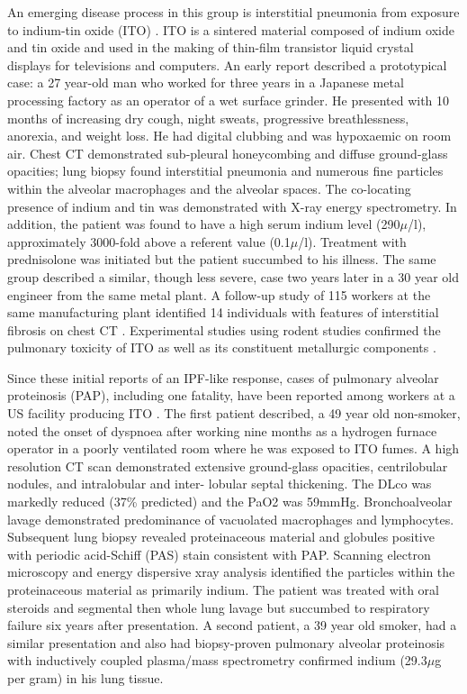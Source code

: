 \documentclass[a4
er,12pt]{article}
\begin{document}
An emerging disease process in this group is interstitial pneumonia from exposure to indium-tin oxide (ITO) \cite{Cummings2010,Cummings2012,Cummings2013,Homma2003,Homma2005, Lison2010,Lison2009,Omae2011,Tanaka2010,Xiao2010}. ITO is a sintered material composed of indium oxide and tin oxide and used in the making of thin-film transistor liquid crystal displays for televisions and computers. An early report \cite{Homma2003} described a prototypical case: a 27 year-old man who worked for three years in a Japanese metal processing factory as an operator of a wet surface grinder. He presented with 10 months of increasing dry cough, night sweats, progressive breathlessness, anorexia, and weight loss. He had digital clubbing and was hypoxaemic on room air. Chest CT demonstrated sub-pleural honeycombing and diffuse ground-glass opacities; lung biopsy found interstitial pneumonia and numerous fine particles within the alveolar macrophages and the alveolar spaces. The co-locating presence of indium and tin was demonstrated with X-ray energy spectrometry. In addition, the patient was found to have a high serum indium level (290\ensuremath{\mu}/l), approximately 3000-fold above a referent value (0.1\ensuremath{\mu}/l). Treatment with prednisolone was initiated but the patient succumbed to his illness. The same group described a similar, though less severe, case two years later \cite{Homma2005} in a 30 year old engineer from the same metal plant. A follow-up study of 115 workers at the same manufacturing plant identified 14 individuals with features of interstitial fibrosis on chest CT \cite{Chonan2004}. Experimental studies using rodent studies confirmed the pulmonary toxicity of ITO as well as its constituent metallurgic components \cite{Tanaka2010,Lison2010}.

Since these initial reports of an IPF-like response, cases of pulmonary alveolar proteinosis (PAP), including one fatality, have been reported among workers at a US facility producing ITO \cite{Cummings2010}. The first patient described, a 49 year old non-smoker, noted the onset of dyspnoea after working nine months as a hydrogen furnace operator in a poorly ventilated room where he was exposed to ITO fumes. A high resolution CT scan demonstrated extensive ground-glass opacities, centrilobular nodules, and intralobular and inter- lobular septal thickening. The DLco was markedly reduced (37\% predicted) and the PaO2 was 59mmHg. Bronchoalveolar lavage demonstrated predominance of vacuolated macrophages and lymphocytes. Subsequent lung biopsy revealed proteinaceous material and globules positive with periodic acid-Schiff (PAS) stain consistent with PAP. Scanning electron microscopy and energy dispersive xray analysis identified the particles within the proteinaceous material as primarily indium. The patient was treated with oral steroids and segmental then whole lung lavage but succumbed to respiratory failure six years after presentation. A second patient, a 39 year old smoker, had a similar presentation and also had biopsy-proven pulmonary alveolar proteinosis with inductively coupled plasma/mass spectrometry confirmed indium (29.3\ensuremath{\mu}g per gram) in his lung tissue.
\end{document}
